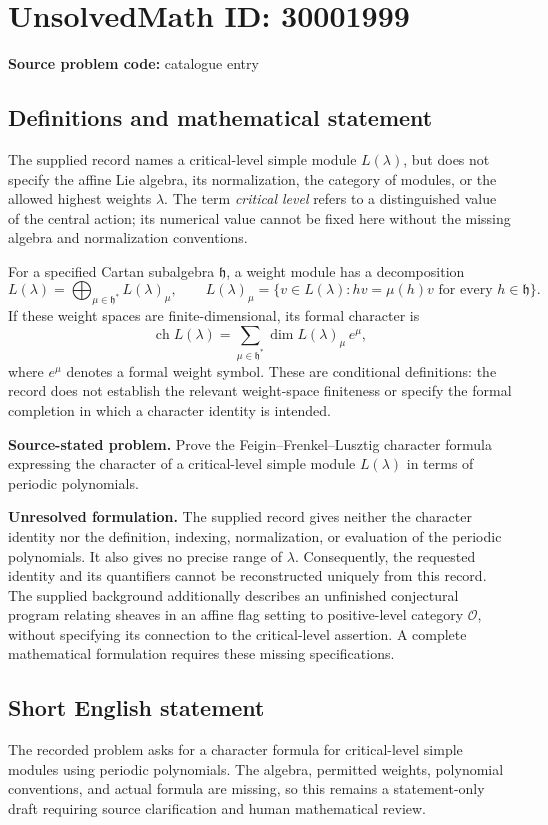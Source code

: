 \documentclass[11pt]{article}
\begin{document}
\section*{UnsolvedMath ID: 30001999}
\textbf{Source problem code:} catalogue entry
\subsection{Definitions and mathematical statement}
The supplied record names a critical-level simple module \(L(\lambda)\), but does not specify the affine Lie algebra, its normalization, the category of modules, or the allowed highest weights \(\lambda\). The term \emph{critical level} refers to a distinguished value of the central action; its numerical value cannot be fixed here without the missing algebra and normalization conventions.

For a specified Cartan subalgebra \(\mathfrak h\), a weight module has a decomposition
\[
L(\lambda)=\bigoplus_{\mu\in\mathfrak h^*}L(\lambda)_\mu,
\qquad
L(\lambda)_\mu=\{v\in L(\lambda):hv=\mu(h)v\text{ for every }h\in\mathfrak h\}.
\]
If these weight spaces are finite-dimensional, its formal character is
\[
\operatorname{ch}L(\lambda)=\sum_{\mu\in\mathfrak h^*}\dim L(\lambda)_\mu\,e^\mu,
\]
where \(e^\mu\) denotes a formal weight symbol. These are conditional definitions: the record does not establish the relevant weight-space finiteness or specify the formal completion in which a character identity is intended.

\textbf{Source-stated problem.} Prove the Feigin--Frenkel--Lusztig character formula expressing the character of a critical-level simple module \(L(\lambda)\) in terms of periodic polynomials.

\textbf{Unresolved formulation.} The supplied record gives neither the character identity nor the definition, indexing, normalization, or evaluation of the periodic polynomials. It also gives no precise range of \(\lambda\). Consequently, the requested identity and its quantifiers cannot be reconstructed uniquely from this record. The supplied background additionally describes an unfinished conjectural program relating sheaves in an affine flag setting to positive-level category \(\mathcal O\), without specifying its connection to the critical-level assertion. A complete mathematical formulation requires these missing specifications.
\subsection{Short English statement}
The recorded problem asks for a character formula for critical-level simple modules using periodic polynomials. The algebra, permitted weights, polynomial conventions, and actual formula are missing, so this remains a statement-only draft requiring source clarification and human mathematical review.
\end{document}
